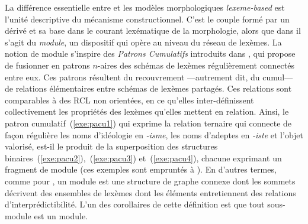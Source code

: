 \documentclass[output=paper]{langsci/langscibook}
\begin{document}
La différence essentielle entre \paradis{} et les modèles morphologiques \emph{lexeme-based} est l'unité descriptive du mécanisme constructionnel.  C'est le couple formé par un dérivé et sa base dans le courant lexématique de la morphologie, alors que dans \paradis{} il s'agit du \emph{module}, un dispositif qui opère au niveau du réseau de lexèmes. La notion de module s'inspire des \emph{Patrons Cumulatifs} introduits dans \cite{Bochner93}, qui propose de fusionner en patrons $n$-aires des schémas de lexèmes régulièrement connectés entre eux.  Ces patrons résultent du recouvrement ---autrement dit, du cumul--- de relations élémentaires entre schémas de lexèmes partagés.  Ces relations sont comparables à des RCL non orientées, en ce qu'elles inter-définissent collectivement les propriétés des lexèmes qu'elles mettent en relation. Ainsi, le patron cumulatif~(\ref{exe:pacu1}) qui exprime la relation ternaire qui connecte de façon régulière les noms d'idéologie en \emph{\mbox{-isme}}, les noms d'adeptes en \emph{\mbox{-iste}} et l'objet valorisé, est-il le produit de la superposition des structures binaires~(\ref{exe:pacu2}),~(\ref{exe:pacu3}) et~(\ref{exe:pacu4}), chacune exprimant un fragment de module (ces exemples sont empruntés à \cite{strnadova2014.phd}). En d'autres termes, comme pour \cite{Bochner93}, un module est une structure de graphe connexe dont les sommets décrivent des ensembles de lexèmes dont les éléments entretiennent des relations d'interprédictibilité. L'un des corollaires de cette définition est que  tout sous-module est un module.
\end{document}
